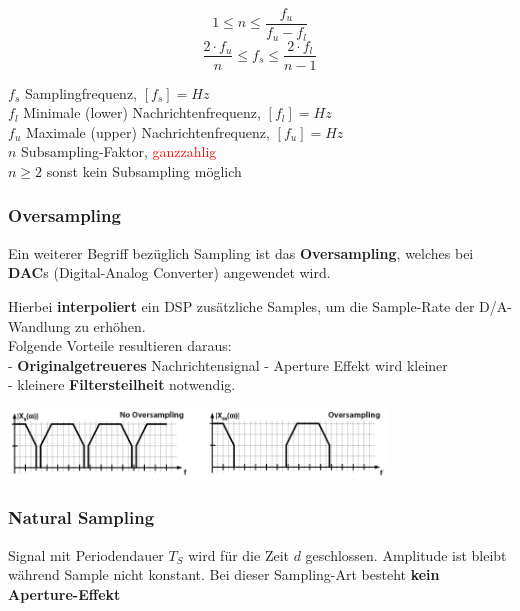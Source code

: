 \begin{minipage}[t][2cm][c]{10cm}
$$ 1 \leq n \leq \frac{f_u}{f_u - f_l} $$
$$ \frac{2 \cdot f_u}{n} \leq f_s \leq \frac{2 \cdot f_l}{n-1}$$
\end{minipage}
\begin{minipage}[t][2cm][c]{8cm}
	$f_s$ Samplingfrequenz, $[f_s] = Hz$ \\
	$f_l$ Minimale (lower) Nachrichtenfrequenz, $[f_l] = Hz$ \\
	$f_u$ Maximale (upper) Nachrichtenfrequenz, $[f_u] = Hz$ \\
	$n$ Subsampling-Faktor, \textcolor{red}{ganzzahlig} \\
	$n \geq 2$ sonst kein Subsampling möglich
\end{minipage}

\subsubsection{Oversampling}
Ein weiterer Begriff bezüglich Sampling ist das \textbf{Oversampling}, welches bei \textbf{DAC}s
(Digital-Analog Converter) angewendet wird. \\
	\begin{minipage}{9cm}
		Hierbei \textbf{interpoliert} ein DSP zusätzliche Samples, um die Sample-Rate der D/A-Wandlung zu erhöhen.\\
		Folgende Vorteile resultieren daraus:\\ 
		- \textbf{Originalgetreueres} Nachrichtensignal
		- Aperture Effekt wird kleiner\\
		- kleinere
		\textbf{Filtersteilheit} notwendig.
	\end{minipage}
	\begin{minipage}{10cm}
		\includegraphics[width=10cm]{bilder/dig_oversampling.png}
	\end{minipage}

\subsubsection{Natural Sampling }
Signal mit Periodendauer $T_S$ wird für die Zeit $d$ geschlossen. Amplitude ist bleibt
während Sample nicht konstant. Bei dieser Sampling-Art besteht \textbf{kein Aperture-Effekt}\\

